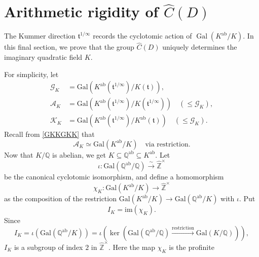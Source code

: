 \documentclass[reqno,11pt]{article}
\theoremstyle{plain} %
\theoremstyle{definition} %
\begin{document}
\section{Arithmetic rigidity of $\widehat C(D)$}

The Kummer direction $\mathfrak{t}^{1/\infty}$ records the cyclotomic
action of $\operatorname{Gal}(K^\mathrm{ab}/K)$. In this final section, we
prove that the group $\widehat{C}(D)$ uniquely determines the imaginary
quadratic field $K$.
\par
For simplicity, let
\begin{align*}
\mathcal{G}_K&=\mathrm{Gal}\left(
K^\mathrm{ab}(\mathfrak{t}^{1/\infty})/K(\mathfrak{t})\right),\\
\mathcal{A}_K&=\mathrm{Gal}\left(
K^\mathrm{ab}(\mathfrak{t}^{1/\infty})/K(\mathfrak{t}^{1/\infty})\right)
\quad(\leq \mathcal{G}_K),\\
\mathcal{K}_K&=\mathrm{Gal}\left(
K^\mathrm{ab}(\mathfrak{t}^{1/\infty})/K^\mathrm{ab}(\mathfrak{t})\right)
\quad(\leq \mathcal{G}_K).
\end{align*}
Recall from \eqref{GKKGKK} that
\begin{equation}\label{AKG}
\mathcal{A}_K\simeq
\mathrm{Gal}(K^\mathrm{ab}/K)\quad\textrm{via restriction}.
\end{equation}
Now that $K/\mathbb{Q}$ is abelian, we get
$K\subseteq\mathbb{Q}^\mathrm{ab}\subseteq K^\mathrm{ab}$.
Let
\begin{equation*}
\iota:\mathrm{Gal}(\mathbb{Q}^\mathrm{ab}/\mathbb{Q})
\stackrel{\sim}{\rightarrow}\widehat{\mathbb{Z}}^\times
\end{equation*}
be the canonical cyclotomic isomorphism, and define a homomorphism
\begin{equation*}
\chi_K:\mathrm{Gal}(K^\mathrm{ab}/K)
\rightarrow\widehat{\mathbb{Z}}^\times
\end{equation*}
as the composition of the restriction $\mathrm{Gal}(K^\mathrm{ab}/K)\rightarrow
\mathrm{Gal}(\mathbb{Q}^\mathrm{ab}/K)$
with $\iota$. Put
\begin{equation}\label{IKdef}
I_K=\mathrm{im}(\chi_K).
\end{equation}
Since
\begin{equation}\label{IK}
I_K=\iota\left(\mathrm{Gal}(\mathbb{Q}^\mathrm{ab}/K)\right)
=\iota\left(
\ker\left(
\mathrm{Gal}(\mathbb{Q}^\mathrm{ab}/\mathbb{Q})
\stackrel{\mathrm{restriction}}{\longrightarrow}
\mathrm{Gal}(K/\mathbb{Q})
\right)\right),
\end{equation}
$I_K$ is a subgroup of index $2$ in $\widehat{\mathbb{Z}}^\times$. Here the map $\chi_K$ is the profinite
\end{document}

